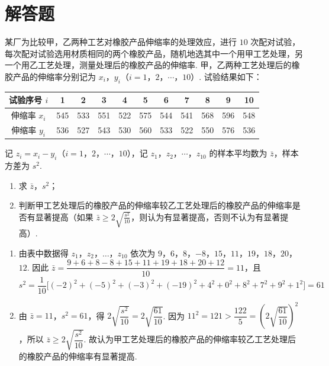 \section{解答题}

\begin{problem}
某厂为比较甲，乙两种工艺对橡胶产品伸缩率的处理效应，进行 \(10\) 次配对试验，每次配对试验选用材质相同的两个橡胶产品，随机地选其中一个用甲工艺处理，另一个用乙工艺处理，测量处理后的橡胶产品的伸缩率. 甲，乙两种工艺处理后的橡胶产品的伸缩率分别记为 \(x_i\)，\(y_i\)（\(i=1\)，\(2\)，\(\cdots\)，\(10\)）. 试验结果如下：

\begin{center}
\begin{tabular}{c|cccccccccc}
试验序号 \(i\)&1&2&3&4&5&6&7&8&9&10\\\hline
伸缩率 \(x_i\)&545&533&551&522&575&544&541&568&596&548\\
伸缩率 \(y_i\)&536&527&543&530&560&533&522&550&576&536
\end{tabular}
\end{center}

记 \(z_i=x_i-y_i\)（\(i=1\)，\(2\)，\(\cdots\)，\(10\)），记 \(z_1\)，\(z_2\)，\(\cdots\)，\(z_{10}\) 的样本平均数为 \(\bar z\)，样本方差为 \(s^2\).
\begin{enumerate}
\item 求 \(\bar z\)，\(s^2\)；
\item 判断甲工艺处理后的橡胶产品的伸缩率较乙工艺处理后的橡胶产品的伸缩率是否有显著提高（如果 \(\bar z\ge2\sqrt{\frac{s^2}{10}}\)，则认为有显著提高，否则不认为有显著提高）.
\end{enumerate}

\begin{solution}
\begin{enumerate}
\item 由表中数据得
\(z_1\)，\(z_2\)，\(\ldots\)，\(z_{10}\) 依次为 \(9\)，\(6\)，\(8\)，\(-8\)，\(15\)，\(11\)，\(19\)，\(18\)，\(20\)，\(12\).
因此 \(\bar z=\dfrac{9+6+8-8+15+11+19+18+20+12}{10}=11\)，且
\[
s^2=\frac{1}{10}\bigl[(-2)^2+(-5)^2+(-3)^2+(-19)^2+4^2+0^2+8^2+7^2+9^2+1^2\bigr]=61
\]
\item 由 \(\bar z=11\)，\(s^2=61\)，得 \(2\sqrt{\dfrac{s^2}{10}}=2\sqrt{\dfrac{61}{10}}\). 因为 \(11^2=121>\dfrac{122}{5}=\left(2\sqrt{\dfrac{61}{10}}\right)^2\)，所以 \(\bar z\ge2\sqrt{\dfrac{s^2}{10}}\). 故认为甲工艺处理后的橡胶产品的伸缩率较乙工艺处理后的橡胶产品的伸缩率有显著提高.
\end{enumerate}
\end{solution}
\end{problem}

